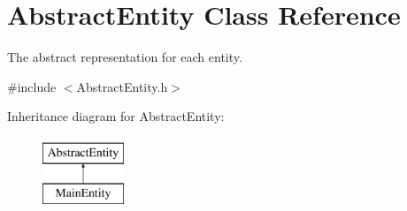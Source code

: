 \hypertarget{class_abstract_entity}{\section{Abstract\-Entity Class Reference}
\label{dd/d52/class_abstract_entity}
}


The abstract representation for each entity.  




{\ttfamily \#include $<$Abstract\-Entity.\-h$>$}

Inheritance diagram for Abstract\-Entity\-:\begin{figure}[H]
\begin{center}
\leavevmode
\includegraphics[height=2.000000cm]{dd/d52/class_abstract_entity}
\end{center}
\end{figure}
